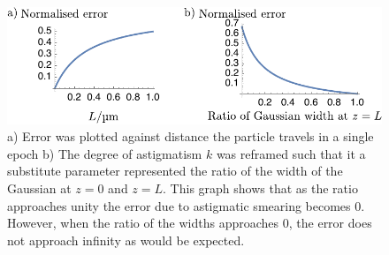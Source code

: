 \begin{figure}
  \centering
  \includegraphics{./mathematica/area_analysis}
  \caption{
  a) Error was plotted against distance the particle travels in a single epoch%
  b) The degree of astigmatism $k$ was reframed such that it a substitute parameter represented the ratio of the width of the Gaussian at $z=0$ and $z=L$.
  This graph shows that as the ratio approaches unity the error due to astigmatic smearing becomes $0$.
  However, when the ratio of the widths approaches 0, the error does not approach infinity as would be expected.
  }
  \label{fig:area_analysis}
\end{figure}

